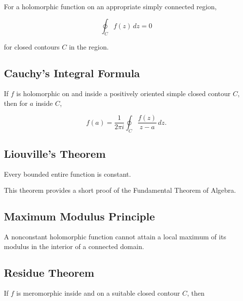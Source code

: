 For a holomorphic function on an appropriate simply connected region,

\[
\boxed{
\oint_C
f(z)\,dz
=
0
}
\]

for closed contours \(C\) in the region.

\subsection{Cauchy's Integral Formula}
\label{subsec:cauchy-integral-formula-summary}

If \(f\) is holomorphic on and inside a positively oriented simple closed
contour \(C\), then for \(a\) inside \(C\),

\[
\boxed{
f(a)
=
\frac{
1
}{
2\pi i
}
\oint_C
\frac{
f(z)
}{
z-a
}
\,dz.
}
\]

\subsection{Liouville's Theorem}
\label{subsec:liouville-summary}

Every bounded entire function is constant.

This theorem provides a short proof of the Fundamental Theorem of Algebra.

\subsection{Maximum Modulus Principle}
\label{subsec:maximum-modulus-summary}

A nonconstant holomorphic function cannot attain a local maximum of its
modulus in the interior of a connected domain.

\subsection{Residue Theorem}
\label{subsec:residue-theorem-summary}

If \(f\) is meromorphic inside and on a suitable closed contour \(C\), then

